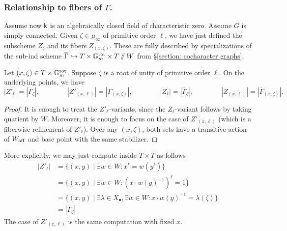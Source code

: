 \subsubsection{Relationship to fibers of $\Gamma$.}\label{subsubsection: relationship to fibers of Gamma}
Assume now $\mathsf{k}$ is an algebraically closed field of characteristic zero. Assume $G$ is simply connected.
Given $\zeta \in \mu_{\infty}$ of primitive order $\ell$, we have just defined the subscheme $Z_{\zeta}$ and its fibers $Z_{(x, \zeta)}$.
%
These are fully described by specializations of the sub-ind scheme $\overline{\Gamma} \hookrightarrow T \times \mathbb{G}_m^{\mathrm{rot}} \times T \sslash W$ from \S \ref{section: cocharacter graphs}.


\begin{lemma}\label{lemma: Z is Gamma}
Let $(x, \zeta) \in T \times \mathbb{G}_m^{\mathrm{rot}}$. Suppose $\zeta$ is a root of unity of primitive order $\ell$. On the underlying points, we have
\begin{equation*}
  |Z'_{\ell}| = |{\Gamma}_{\zeta}|,  \qquad \qquad |Z'_{(x, \ell)}| = |{\Gamma}_{(x, \zeta)}|, \qquad \qquad
  |Z_{\ell}| = |\overline{\Gamma}_{\zeta}|,  \qquad \qquad |Z_{(x, \ell)}| = |\overline{\Gamma}_{(x, \zeta)}|.
\end{equation*}
\end{lemma}
\begin{proof}
   It is enough to treat the $Z'_{\ell}$-variants, since the $Z_{\ell}$-variant follows by taking quatient by $W$. Moreover, it is enough to focus on the case of $Z'_{(x, \ell)}$ (which is a fiberwise refinement of $Z'_{\ell}$). Over any $(x, \zeta)$, both sets have a transitive action of $W_{\mathrm{aff}}$ and base point with the same stabilizer.
\end{proof}

\begin{remark}
    More explicitly, we may just compute inside $T \times T$ as follows
    \begin{align*}
       |Z'_{\ell}|  
       &=  \{ (x, y) \mid \exists w \in W: x^{\ell} = w(y^{\ell}) \} \\ 
       &= \{ (x, y) \mid \exists w \in W: (x \cdot w(y)^{-1})^{\ell} = 1 \} \\
       &= \{ (x, y) \mid \exists \lambda \in X_{\bullet}, \exists w \in W: x \cdot w(y)^{-1} = \lambda(\zeta) \} \\
       &= |\Gamma_{\zeta}| 
    \end{align*}
    The case of $Z'_{(x, \ell)}$ is the same computation with fixed $x$.
\end{remark}

